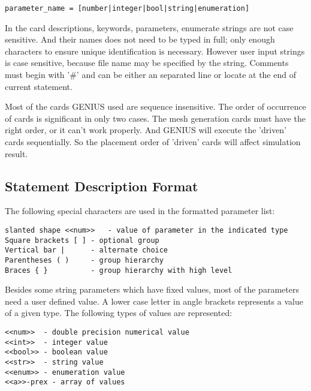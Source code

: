 \documentclass[oneside,12pt]{cgd_book}
\begin{document}
\begin{lstlisting}[style=GeniusCmd]
parameter_name = [number|integer|bool|string|enumeration]
\end{lstlisting}
In the card descriptions, keywords, parameters, enumerate strings are not case sensitive. And their names
        does not need to be typed in full; only enough characters to ensure unique identification is necessary. However
        user input strings is case sensitive, because file name may be specified by the string. Comments must begin with
        '\#' and can be either an separated line or locate at the end of current statement.
\par
{}Most of the cards GENIUS used are sequence insensitive. The order of occurrence of cards is significant
          in only two cases. The mesh generation cards must have the right order, or it can't work properly. And GENIUS
          will execute the 'driven' cards sequentially. So the placement order of 'driven' cards will affect simulation
          result.
\par
\par
\subsection{Statement Description Format}
The following special characters are used in the formatted parameter list:
\par
\par
\begin{lstlisting}[style=GeniusCmd]
slanted shape <<num>>   - value of parameter in the indicated type
Square brackets [ ] - optional group
Vertical bar |      - alternate choice
Parentheses ( )     - group hierarchy
Braces { }          - group hierarchy with high level
\end{lstlisting}
Besides some string parameters which have fixed values, most of the parameters need a user defined
          value. A lower case letter in angle brackets represents a value of a given type. The following types of values
          are represented:
\par
\par
\begin{lstlisting}[style=GeniusCmd]
<<num>>  - double precision numerical value
<<int>>  - integer value
<<bool>> - boolean value
<<str>>  - string value
<<enum>> - enumeration value
<<a>>-prex - array of values
\end{lstlisting}
\end{document}
